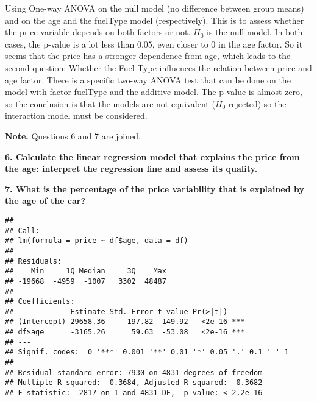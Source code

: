 \documentclass[
]{article}
\newenvironment{Shaded}{\begin{snugshade}}{\end{snugshade}}
\newcommand{\AttributeTok}[1]{\textcolor[rgb]{0.77,0.63,0.00}{#1}}
\newcommand{\DecValTok}[1]{\textcolor[rgb]{0.00,0.00,0.81}{#1}}
\newcommand{\FunctionTok}[1]{\textcolor[rgb]{0.00,0.00,0.00}{#1}}
\newcommand{\NormalTok}[1]{#1}
\newcommand{\OtherTok}[1]{\textcolor[rgb]{0.56,0.35,0.01}{#1}}
\newcommand{\SpecialCharTok}[1]{\textcolor[rgb]{0.00,0.00,0.00}{#1}}
\newcommand{\StringTok}[1]{\textcolor[rgb]{0.31,0.60,0.02}{#1}}
\begin{document}
Using One-way ANOVA on the null model (no difference between group
means) and on the age and the fuelType model (respectively). This is to
assess whether the price variable depends on both factors or not.
\(H_0\) is the null model. In both cases, the p-value is a lot less than
0.05, even closer to 0 in the age factor. So it seems that the price has
a stronger dependence from age, which leads to the second question:
Whether the Fuel Type influences the relation between price and age
factor. There is a specific two-way ANOVA test that can be done on the
model with factor fuelType and the additive model. The p-value is almost
zero, so the conclusion is that the models are not equivalent (\(H_0\)
rejected) so the interaction model must be considered.

\newpage

\textbf{Note.} Questions 6 and 7 are joined.

\textbf{6. Calculate the linear regression model that explains the price from the age: interpret the
regression line and assess its quality.}

\textbf{7. What is the percentage of the price variability that is explained by the age of the car?}

\begin{Shaded}
\end{Shaded}

\begin{verbatim}
## 
## Call:
## lm(formula = price ~ df$age, data = df)
## 
## Residuals:
##    Min     1Q Median     3Q    Max 
## -19668  -4959  -1007   3302  48487 
## 
## Coefficients:
##             Estimate Std. Error t value Pr(>|t|)    
## (Intercept) 29658.36     197.82  149.92   <2e-16 ***
## df$age      -3165.26      59.63  -53.08   <2e-16 ***
## ---
## Signif. codes:  0 '***' 0.001 '**' 0.01 '*' 0.05 '.' 0.1 ' ' 1
## 
## Residual standard error: 7930 on 4831 degrees of freedom
## Multiple R-squared:  0.3684, Adjusted R-squared:  0.3682 
## F-statistic:  2817 on 1 and 4831 DF,  p-value: < 2.2e-16
\end{verbatim}

\begin{Shaded}
\end{Shaded}
\end{document}
